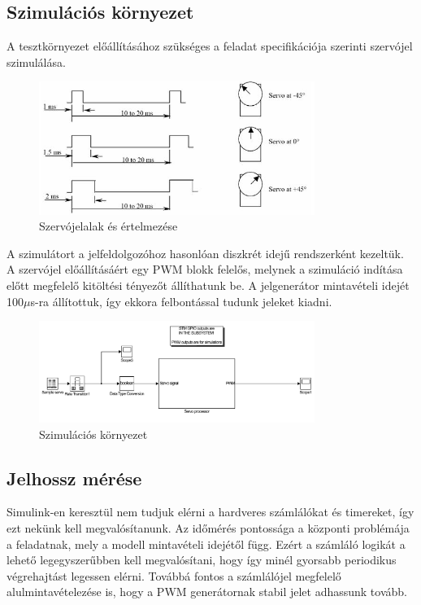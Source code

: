 \subsection{Szimulációs környezet}

A tesztkörnyezet előállításához szükséges a feladat specifikációja szerinti szervójel szimulálása.

\begin{figure}[H]
	\centering
	\includegraphics[width=0.8\textwidth]{fig/servosignal}
	\caption{Szervójelalak és értelmezése}
	\label{fig:servosignal}
\end{figure}

A szimulátort a jelfeldolgozóhoz hasonlóan diszkrét idejű rendszerként kezeltük. A szervójel előállításáért egy PWM blokk felelős, melynek a szimuláció indítása előtt megfelelő kitöltési tényezőt állíthatunk be. A jelgenerátor mintavételi idejét 100$\mu$s-ra állítottuk, így ekkora felbontással tudunk jeleket kiadni.

\begin{figure}[H]
	\centering
	\includegraphics[width=0.8\textwidth]{fig/toplayer}
	\caption{Szimulációs környezet}
	\label{fig:toplayer}
\end{figure}

\subsection{Jelhossz mérése}

Simulink-en keresztül nem tudjuk elérni a hardveres számlálókat és timereket, így ezt nekünk kell megvalósítanunk. Az időmérés pontossága a központi problémája a feladatnak, mely a modell mintavételi idejétől függ. Ezért a számláló logikát a lehető legegyszerűbben kell megvalósítani, hogy így minél gyorsabb periodikus végrehajtást legessen elérni. Továbbá fontos a számlálójel megfelelő alulmintavételezése is, hogy a PWM generátornak stabil jelet adhassunk tovább.

